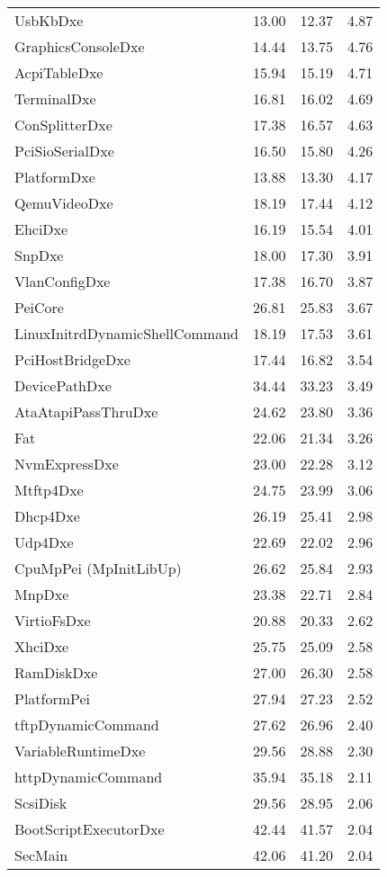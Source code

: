 \begin{longtable}{l c c c}
  UsbKbDxe & 13.00 & 12.37 & 4.87\\
  GraphicsConsoleDxe & 14.44 & 13.75 & 4.76\\
  AcpiTableDxe & 15.94 & 15.19 & 4.71\\
  TerminalDxe & 16.81 & 16.02 & 4.69\\
  ConSplitterDxe & 17.38 & 16.57 & 4.63\\
  PciSioSerialDxe & 16.50 & 15.80 & 4.26\\
  PlatformDxe & 13.88 & 13.30 & 4.17\\
  QemuVideoDxe & 18.19 & 17.44 & 4.12\\
  EhciDxe & 16.19 & 15.54 & 4.01\\
  SnpDxe & 18.00 & 17.30 & 3.91\\
  VlanConfigDxe & 17.38 & 16.70 & 3.87\\
  PeiCore & 26.81 & 25.83 & 3.67\\
  LinuxInitrdDynamicShellCommand & 18.19 & 17.53 & 3.61\\
  PciHostBridgeDxe & 17.44 & 16.82 & 3.54\\
  DevicePathDxe & 34.44 & 33.23 & 3.49\\
  AtaAtapiPassThruDxe & 24.62 & 23.80 & 3.36\\
  Fat & 22.06 & 21.34 & 3.26\\
  NvmExpressDxe & 23.00 & 22.28 & 3.12\\
  Mtftp4Dxe & 24.75 & 23.99 & 3.06\\
  Dhcp4Dxe & 26.19 & 25.41 & 2.98\\
  Udp4Dxe & 22.69 & 22.02 & 2.96\\
  CpuMpPei (MpInitLibUp) & 26.62 & 25.84 & 2.93\\
  MnpDxe & 23.38 & 22.71 & 2.84\\
  VirtioFsDxe & 20.88 & 20.33 & 2.62\\
  XhciDxe & 25.75 & 25.09 & 2.58\\
  RamDiskDxe & 27.00 & 26.30 & 2.58\\
  PlatformPei & 27.94 & 27.23 & 2.52\\
  tftpDynamicCommand & 27.62 & 26.96 & 2.40\\
  VariableRuntimeDxe & 29.56 & 28.88 & 2.30\\
  httpDynamicCommand & 35.94 & 35.18 & 2.11\\
  ScsiDisk & 29.56 & 28.95 & 2.06\\
  BootScriptExecutorDxe & 42.44 & 41.57 & 2.04\\
  SecMain & 42.06 & 41.20 & 2.04\\

\end{longtable}
